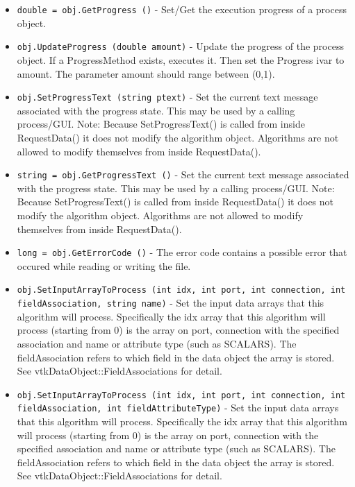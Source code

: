 \begin{itemize}
\item  \verb|double = obj.GetProgress ()| -  Set/Get the execution progress of a process object.

\item  \verb|obj.UpdateProgress (double amount)| -  Update the progress of the process object. If a ProgressMethod exists,
 executes it.  Then set the Progress ivar to amount. The parameter amount
 should range between (0,1).

\item  \verb|obj.SetProgressText (string ptext)| -  Set the current text message associated with the progress state.
 This may be used by a calling process/GUI.
 Note: Because SetProgressText() is called from inside RequestData()
 it does not modify the algorithm object. Algorithms are not 
 allowed to modify themselves from inside RequestData().

\item  \verb|string = obj.GetProgressText ()| -  Set the current text message associated with the progress state.
 This may be used by a calling process/GUI.
 Note: Because SetProgressText() is called from inside RequestData()
 it does not modify the algorithm object. Algorithms are not 
 allowed to modify themselves from inside RequestData().

\item  \verb|long = obj.GetErrorCode ()| -  The error code contains a possible error that occured while
 reading or writing the file.

\item  \verb|obj.SetInputArrayToProcess (int idx, int port, int connection, int fieldAssociation, string name)| -  Set the input data arrays that this algorithm will
 process. Specifically the idx array that this algorithm will process
 (starting from 0) is the array on port, connection with the specified
 association and name or attribute type (such as SCALARS). The
 fieldAssociation refers to which field in the data object the array is
 stored. See vtkDataObject::FieldAssociations for detail.

\item  \verb|obj.SetInputArrayToProcess (int idx, int port, int connection, int fieldAssociation, int fieldAttributeType)| -  Set the input data arrays that this algorithm will
 process. Specifically the idx array that this algorithm will process
 (starting from 0) is the array on port, connection with the specified
 association and name or attribute type (such as SCALARS). The
 fieldAssociation refers to which field in the data object the array is
 stored. See vtkDataObject::FieldAssociations for detail.


\end{itemize}
